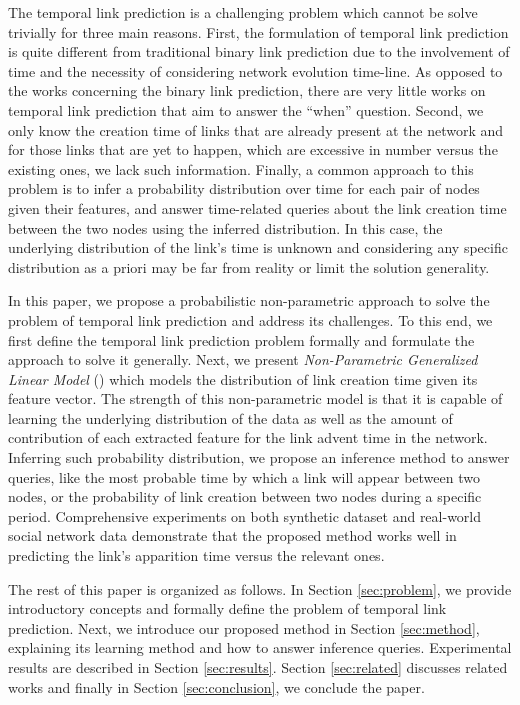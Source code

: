 The temporal link prediction is a challenging problem which cannot be solve trivially for three main reasons. First, the formulation of temporal link prediction is quite different from traditional binary link prediction due to the involvement of time and the necessity of considering network evolution time-line. As opposed to the works concerning the binary link prediction, there are very little works on temporal link prediction that aim to answer the ``when'' question. Second, we only know the creation time of links that are already present at the network and for those links that are yet to happen, which are excessive in number versus the existing ones, we lack such information. Finally, a common approach to this problem is to infer a probability distribution over time for each pair of nodes given their features, and answer time-related queries about the link creation time between the two nodes using the inferred distribution. In this case, the underlying distribution of the link's time is unknown and considering any specific distribution as a priori may be far from reality or limit the solution generality.

In this paper, we propose a probabilistic non-parametric approach to solve the problem of temporal link prediction and address its challenges. To this end, we first define the temporal link prediction problem formally and formulate the approach to solve it generally. Next, we present \emph{Non-Parametric Generalized Linear Model} (\npglm) which models the distribution of link creation time given its feature vector. The strength of this non-parametric model is that it is capable of learning the underlying distribution of the data as well as the amount of contribution of each extracted feature for the link advent time in the network. Inferring such probability distribution, we propose an inference method to answer queries, like the most probable time by which a link will appear between two nodes, or the probability of link creation between two nodes during a specific period. Comprehensive experiments on both synthetic dataset and real-world social network data demonstrate that the proposed method works well in predicting the link's apparition time versus the relevant ones.

The rest of this paper is organized as follows. In Section \ref{sec:problem}, we provide introductory concepts and formally define the problem of temporal link prediction. Next, we introduce our proposed \npglm method in Section \ref{sec:method}, explaining its learning method and how to answer inference queries. Experimental results are described in Section \ref{sec:results}. Section \ref{sec:related} discusses related works and finally in Section \ref{sec:conclusion}, we conclude the paper.
